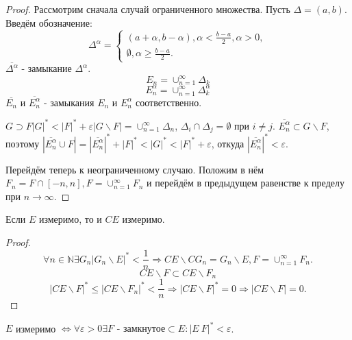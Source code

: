 \documentclass[11pt]{article}
\newcounter{th}\setcounter{th}{0}
\def\th{\par\smallskip\refstepcounter{th}\textbf{\arabic{th}}}
\newtheorem*{Theorem}{Теорема \th}
\begin{document}
\begin{proof}
Рассмотрим сначала случай ограниченного множества. Пусть $\Delta = (a, b)$. Введём обозначение:
\begin{equation*}
\Delta^{\alpha} = \begin{cases}
(a + \alpha, b - \alpha), \alpha < \frac{b - a}2, \alpha > 0, \\
\emptyset, \alpha \geq \frac{b - a}2.
\end{cases}
\end{equation*}
$\overline{\Delta^{\alpha}}$ - замыкание $\Delta^{\alpha}$.
\begin{equation*}
E_n = \cup_{n = 1}^{\infty}\Delta_k
\end{equation*}
\begin{equation*}
E_n^{\alpha} = \cup_{n = 1}^{\infty}\Delta_k^{\alpha}
\end{equation*}
$\overline{E_n}$ и $\overline{E_n^{\alpha}}$ - замыкания $E_n$ и $E_n^{\alpha}$ соответственно.

$G \supset F |G|^* < |F|^* + \varepsilon |G \backslash F| = \cup_{n = 1}^{\infty}\Delta_n$,
$\Delta_i \cap \Delta_j = \emptyset$ при $i \neq j$. $\overline{E_n^{\alpha}} \subset G \backslash F$,
поэтому $|\overline{E_n^{\alpha}} \cup F| = |\overline{E_n^{\alpha}}|^* + |F|^* < |G|^* < |F|^* + \varepsilon$,
откуда $|\overline{E_n^{\alpha}}|^* < \varepsilon$.

Перейдём теперь к неограниченному случаю. Положим в нём $F_n = F \cap [-n, n], F = \cup_{n = 1}^{\infty}F_n$
и перейдём в предыдущем равенстве к пределу при $n \to \infty$.
\end{proof}
\begin{Theorem}
Если $E$ измеримо, то и $CE$ измеримо.
\end{Theorem}
\begin{proof}
\begin{equation*}
\forall n \in \mathbb{N} \exists G_n |G_n \backslash E|^* < \frac1n \Rightarrow
CE \backslash CG_n = G_n \backslash E, F = \cup_{n = 1}^{\infty}F_n.
\end{equation*}
\begin{equation*}
CE \backslash F \subset CE \backslash F_n
\end{equation*}
\begin{equation*}
|CE \backslash F|^* \leq |CE \backslash F_n|^* < \frac1n \Rightarrow
|CE \backslash F|^* = 0 \Rightarrow |CE \backslash F| = 0.
\end{equation*}
\end{proof}
\begin{Theorem}
$E$ измеримо $\Leftrightarrow \forall \varepsilon > 0 \exists F\text{ - замкнутое} \subset E: |E \ F|^* < \varepsilon$.
\end{Theorem}
\end{document}
